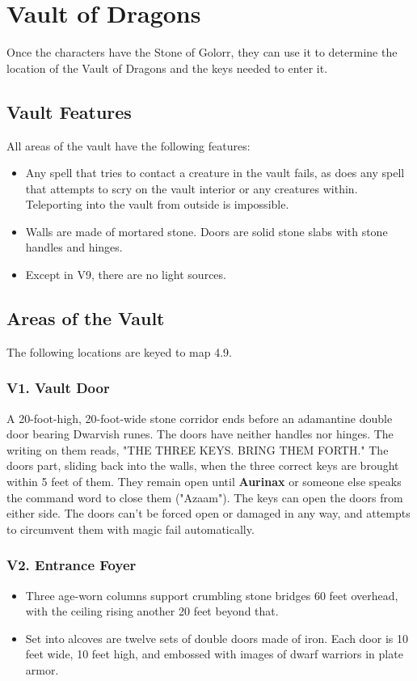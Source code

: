 \documentclass[10pt,a4paper,twoside,twocolumn,openany,nodeprecatedcode]{dndbook}
\begin{document}
\section{Vault of Dragons}
Once the characters have the Stone of Golorr, they can use it to determine the location of the Vault of Dragons and the keys needed to enter it.
\subsection{Vault Features}
All areas of the vault have the following features:
\begin{itemize}

\item Any spell that tries to contact a creature in the vault fails, as does any spell that attempts to scry on the vault interior or any creatures within. Teleporting into the vault from outside is impossible.
\item Walls are made of mortared stone. Doors are solid stone slabs with stone handles and hinges.
\item Except in V9, there are no light sources.
\end{itemize}


\subsection{Areas of the Vault}
The following locations are keyed to map 4.9.
\subsubsection{V1. Vault Door}
A 20-foot-high, 20-foot-wide stone corridor ends before an adamantine double door bearing Dwarvish runes. The doors have neither handles nor hinges. The writing on them reads, "THE THREE KEYS. BRING THEM FORTH."
The doors part, sliding back into the walls, when the three correct keys are brought within 5 feet of them. They remain open until \textbf{Aurinax} or someone else speaks the command word to close them ("Azaam"). The keys can open the doors from either side. The doors can't be forced open or damaged in any way, and attempts to circumvent them with magic fail automatically.
\subsubsection{V2. Entrance Foyer}
\begin{itemize}

\item Three age-worn columns support crumbling stone bridges 60 feet overhead, with the ceiling rising another 20 feet beyond that.
\item Set into alcoves are twelve sets of double doors made of iron. Each door is 10 feet wide, 10 feet high, and embossed with images of dwarf warriors in plate armor.
\end{itemize}
\end{document}
